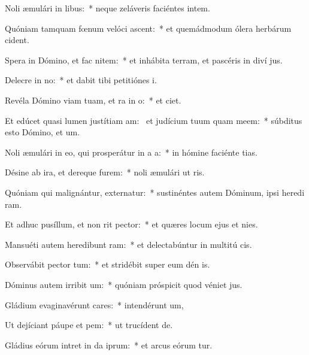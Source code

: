 \item Noli æmulári in libus:~* neque zeláveris faciéntes intem.
\item Quóniam tamquam fœnum velóci ascent:~* et quemádmodum ólera herbárum  cident.
\item Spera in Dómino, et fac nitem:~* et inhábita terram, et pascéris in diví jus.
\item Delecre in no:~* et dabit tibi petitiónes  i.
\item Revéla Dómino viam tuam, et ra in o:~* et  ciet.
\item Et edúcet quasi lumen justítiam am:~\pscross{} et judícium tuum quam meem:~* súbditus esto Dómino, et  um.
\item Noli æmulári in eo, qui prosperátur in a a:~* in hómine faciénte tias.
\item Désine ab ira, et dereque furem:~* noli æmulári ut ris.
\item Quóniam qui malignántur, externatur:~* sustinéntes autem Dóminum, ipsi heredi ram.
\item Et adhuc pusíllum, et non rit pector:~* et quæres locum ejus et  nies.
\item Mansuéti autem heredibunt ram:~* et delectabúntur in multitú cis.
\item Observábit pector tum:~* et stridébit super eum dén is.
\item Dóminus autem irribit um:~* quóniam próspicit quod véniet  jus.
\item Gládium evaginavérunt cares:~* intendérunt  um,
\item Ut dejíciant páupe et pem:~* ut trucídent  de.
\item Gládius eórum intret in da iprum:~* et arcus eórum tur.
